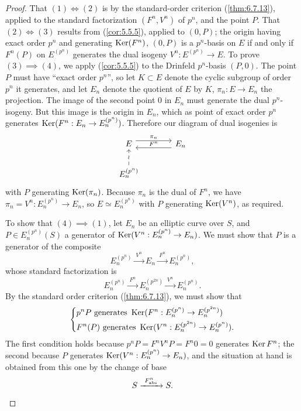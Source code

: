 \begin{proof}
That $(1) \iff (2)$ is by the standard-order criterion (\ref{thm:6.7.13}), applied to the standard factorization $(F^n, V^n)$ of $p^n$, and the point $P$. That $(2) \iff (3)$ results from (\ref{cor:5.5.5}), applied to $(0, P)$; the origin having exact order $p^n$ and generating $\operatorname{Ker}(F^n)$, $(0, P)$ is a $p^n$-basis on $E$ if and only if $F^n(P)$ on $E^{(p^n)}$ generates the dual isogeny $V^n : E^{(p^n)} \to E$. To prove $(3) \implies (4)$, we apply (\ref{cor:5.5.5}) to the Drinfeld $p^n$-basis $(P, 0)$. The point $P$ must have ``exact order $p^n$'', so let $K \subset E$ denote the cyclic subgroup of order $p^n$ it generates, and let $E_n$ denote the quotient of $E$ by $K$, $\pi_n : E \to E_n$ the projection. The image of the second point $0$ in $E_n$ must generate the dual $p^n$-isogeny. But this image is the origin in $E_n$, which as point of exact order $p^n$ generates $\operatorname{Ker}(F^n : E_n \to E_n^{(p^n)})$. Therefore our diagram of dual isogenies is
\[
\begin{tikzcd}[row sep=1.8em, column sep=large]
E \arrow[r, shift left=1ex, "\pi_n"] & E_n \arrow[l, shift left=1ex, "F^n"'] \\
E_n^{(p^n)} \arrow[u, "\wr" description] &
\end{tikzcd}
\]
with $P$ generating $\operatorname{Ker}(\pi_n)$. Because $\pi_n$ is the dual of $F^n$, we have $\pi_n = V^n : E_n^{(p^n)} \to E_n$, so $E \simeq E_n^{(p^n)}$ with $P$ generating $\operatorname{Ker}(V^n)$, as required.

To show that $(4) \implies (1)$, let $E_n$ be an elliptic curve over $S$, and $P \in E_n^{(p^n)}(S)$ a generator of $\operatorname{Ker}(V^n : E_n^{(p^n)} \to E_n)$. We must show that $P$ is a generator of the composite
\[
E_n^{(p^n)} \xrightarrow{\ V^n\ } E_n \xrightarrow{\ F^n\ } E_n^{(p^n)} ,
\]
whose standard factorization is
\[
E_n^{(p^n)} \xrightarrow{\ F^n\ } E_n^{(p^{2n})} \xrightarrow{\ V^n\ } E_n^{(p^n)} .
\]
By the standard order criterion (\ref{thm:6.7.13}), we must show that
\[
\left\{\begin{aligned}
& p^n P \text{ generates } \operatorname{Ker}(F^n : E_n^{(p^n)} \to E_n^{(p^{2n})}) \\
& F^n(P) \text{ generates } \operatorname{Ker}(V^n : E_n^{(p^{2n})} \to E_n^{(p^n)}) .
\end{aligned}\right.
\]
The first condition holds because $p^n P = F^n V^n P = F^n 0 = 0$ generates $\operatorname{Ker} F^n$; the second because $P$ generates $\operatorname{Ker}(V^n : E_n^{(p^n)} \to E_n)$, and the situation at hand is obtained from this one by the change of base
\[
S \xrightarrow{\ F_{\mathrm{abs}}^n\ } S . \qedhere
\]
\end{proof}

